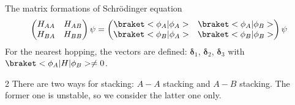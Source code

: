 The matrix formations of Schr\"odinger equation
\begin{equation}
  \begin{pmatrix}
    H_{AA} & H_{AB}\\
    H_{BA} & H_{BB}
  \end{pmatrix}\psi =
  \begin{pmatrix}
    \braket<\phi_A|\phi_A> & \braket<\phi_A|\phi_B>\\
    \braket<\phi_B|\phi_A> & \braket<\phi_B|\phi_B>\\
  \end{pmatrix}\psi
\end{equation}
For the nearest hopping, the vectors are defined: $\bm\delta_1$, $\bm\delta_2$,
$\bm \delta_3$ with $\braket<\phi_A|H|\phi_B> \neq 0$.
\begin{paracol}{2}
There are two ways for stacking: $A-A$ stacking and $A-B$ stacking.
The former one is unstable, so we consider the latter one only.


\end{paracol}
